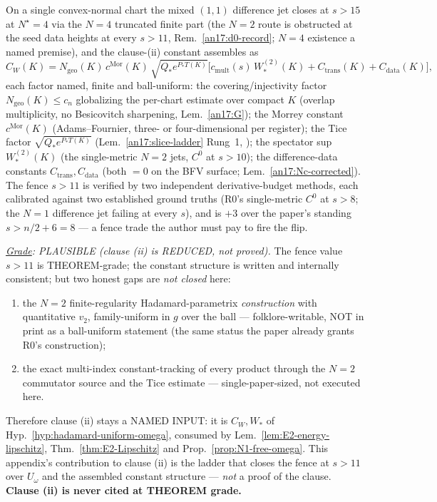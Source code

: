 \begin{remark}
\label{an17:CW-grade}
On a single convex-normal chart the mixed $(1,1)$ difference jet closes at $s>15$
at $N^\star{=}4$ via the $N{=}4$ truncated finite part (the $N{=}2$ route is
obstructed at the seed data heights at every $s>11$, Rem.~\ref{an17:d0-record};
$N{=}4$ existence a named premise), and the clause-(ii) constant assembles as
\[
 C_W(K)=N_{\mathrm{geo}}(K)\,c^{\mathrm{Mor}}(K)\,\sqrt{Q_*e^{P_*T(K)}}
 \bigl[c_{\mathrm{mult}}(s)\,W^{(2)}_*(K)+C_{\mathrm{trans}}(K)+C_{\mathrm{data}}(K)\bigr],
\]
each factor named, finite and ball-uniform: the covering/injectivity factor
$N_{\mathrm{geo}}(K)\le c_n$ globalizing the per-chart estimate over compact $K$
(overlap multiplicity, no Besicovitch sharpening, Lem.~\ref{an17:G}); the Morrey
constant $c^{\mathrm{Mor}}(K)$ (Adams--Fournier, three- or four-dimensional per
register); the Tice factor $\sqrt{Q_*e^{P_*T(K)}}$ (Lem.~\ref{an17:slice-ladder}
Rung~1, \cite{Tice2018}); the spectator sup $W^{(2)}_*(K)$ (the single-metric
$N{=}2$ jets, $C^0$ at $s>10$); the difference-data constants
$C_{\mathrm{trans}},C_{\mathrm{data}}$ (both $=0$ on the BFV surface;
Lem.~\ref{an17:Nc-corrected}). The fence $s>11$ is verified by two independent
derivative-budget methods, each calibrated against two established ground
truths (R0's single-metric $C^0$ at $s>8$; the $N{=}1$ difference jet failing at
every $s$), and is $+3$ over the paper's standing $s>n/2+6=8$ --- a fence trade
the author must pay to fire the flip.

\emph{\underline{Grade}: PLAUSIBLE (clause (ii) is REDUCED, not proved).} The
fence value $s>11$ is THEOREM-grade; the constant structure is written and
internally consistent; but two honest gaps are \emph{not closed} here:
\begin{enumerate}[label=\textup{(\alph*)},leftmargin=*,nosep]
\item the $N{=}2$ finite-regularity Hadamard-parametrix \emph{construction} with
  quantitative $v_2$, family-uniform in $g$ over the ball --- folklore-writable,
  NOT in print as a ball-uniform statement (the same status the paper already
  grants R0's construction);
\item the exact multi-index constant-tracking of every product through the
  $N{=}2$ commutator source and the Tice estimate --- single-paper-sized, not
  executed here.
\end{enumerate}
Therefore clause (ii) stays a NAMED INPUT: it is $C_W,W_*$ of
Hyp.~\ref{hyp:hadamard-uniform-omega}, consumed by
Lem.~\ref{lem:E2-energy-lipschitz}, Thm.~\ref{thm:E2-Lipschitz} and
Prop.~\ref{prop:N1-free-omega}. This appendix's contribution to clause (ii) is
the ladder that closes the fence at $s>11$ over $U_\omega$ and the assembled
constant structure --- \emph{not} a proof of the clause. \textbf{Clause (ii) is
never cited at THEOREM grade.}
\end{remark}

